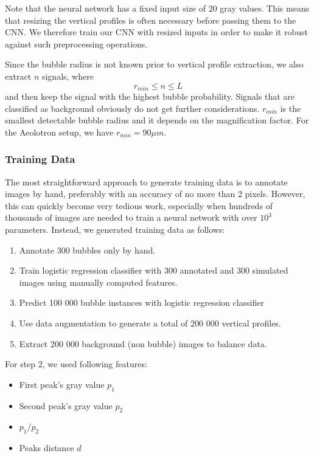 	Note that the neural network has a fixed input size of 20 gray values. This means that resizing the vertical profiles is often necessary before passing them to the CNN. We therefore train our CNN with resized inputs in order to make it robust against such preprocessing operations. 
	
	Since the bubble radius is not known prior to vertical profile extraction, we also extract $n$ signals, where 
	\begin{equation}
		r_{min} \leq n \leq L
	\end{equation}
	and then keep the signal with the highest bubble probability. Signals that are classified as background obviously do not get further considerations. $r_{min}$ is the smallest detectable bubble radius and it depends on the magnification factor. For the Aeolotron setup, we have $r_{min} = 90 \mu m$.

		\subsubsection{Training Data}
			The most straightforward approach to generate training data is to annotate images by hand, preferably with an accuracy of no more than 2 pixels. However, this can quickly become very tedious work, especially when hundreds of thousands of images are needed to train a neural network with over $10^{3}$ parameters. Instead, we generated training data as follows:
			\begin{enumerate}
				\item Annotate 300 bubbles only by hand.
				\item Train logistic regression classifier with 300 annotated and 300 simulated images using manually computed features.
				\item Predict 100 000 bubble instances with logistic regression classifier
				\item Use data augmentation to generate a total of 200 000 vertical profiles. 				
				\item Extract 200 000 background (non bubble) images to balance data.
			\end{enumerate}
			
			For step 2, we used following features:
			\begin{itemize}
				\item First peak's gray value $p_1$
				\item Second peak's gray value $p_2$
				\item $p_1/p_2$
				\item Peaks distance $d$
			\end{itemize}
			
